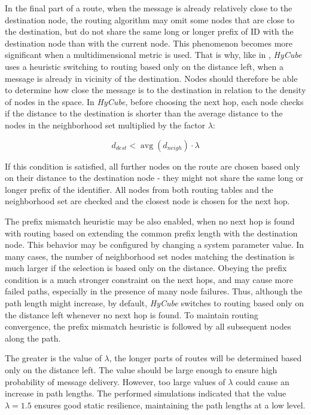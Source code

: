 In the final part of a route, when the message is already relatively close to the destination node, the routing algorithm may omit some nodes that are close to the destination, but do not share the same long or longer prefix of ID with the destination node than with the current node. This phenomenon becomes more significant when a multidimensional metric is used. That is why, like in \cite{pastry}, \emph{HyCube} uses a heuristic switching to routing based only on the distance left, when a message is already in vicinity of the destination. Nodes should therefore be able to determine how close the message is to the destination in relation to the density of nodes in the space. In \emph{HyCube}, before choosing the next hop, each node checks if the distance to the destination is shorter than the average distance to the nodes in the neighborhood set multiplied by the factor $\lambda$: 

\begin{equation}
d_{dest} < \mathop{\mathrm{avg}}(d_{neigh}) \cdot \lambda
\end{equation}

\noindent
If this condition is satisfied, all further nodes on the route are chosen based only on their distance to the destination node - they might not share the same long or longer prefix of the identifier. All nodes from both routing tables and the neighborhood set are checked and the closest node is chosen for the next hop.

The prefix mismatch heuristic may be also enabled, when no next hop is found with routing based on extending the common prefix length with the destination node. This behavior may be configured by changing a system parameter value. In many cases, the number of neighborhood set nodes matching the destination is much larger if the selection is based only on the distance. Obeying the prefix condition is a much stronger constraint on the next hops, and may cause more failed paths, especially in the presence of many node failures. Thus, although the path length might increase, by default, \emph{HyCube} switches to routing based only on the distance left whenever no next hop is found. To maintain routing convergence, the prefix mismatch heuristic is followed by all subsequent nodes along the path.

The greater is the value of $\lambda$, the longer parts of routes will be determined based only on the distance left. The value should be large enough to ensure high probability of message delivery. However, too large values of $\lambda$ could cause an increase in path lengths. The performed simulations indicated that the value $\lambda = 1.5$ ensures good static resilience, maintaining the path lengths at a low level.





